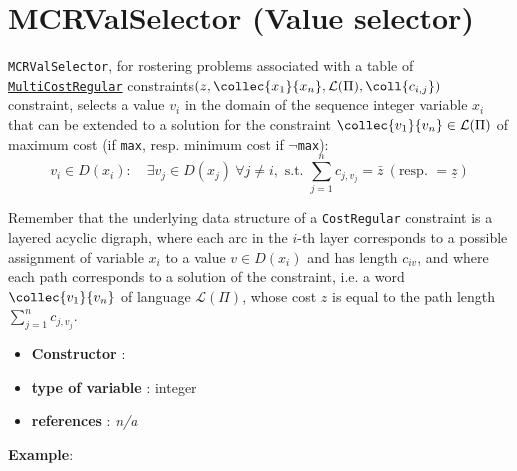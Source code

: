 \section{MCRValSelector (Value selector)}\label{mcrvalselector:mcrvalselectorvalselector}\hypertarget{mcrvalselector:mcrvalselectorvalselector}{}
\begin{notedef}
  \texttt{MCRValSelector}, for rostering problems associated with a table of \hyperlink{costregular:costregularconstraint}{\texttt{MultiCostRegular}} constraints$(z, \collec{x_1}{x_n},\mathcal{L}(\Pi), \coll{c_{i,j}})$ constraint, selects a value $v_i$ in the domain of the sequence integer variable $x_i$ that can be extended to a solution for the constraint $\collec{v_1}{v_n}\in\mathcal{L}(\Pi)$ of maximum cost (if \texttt{max}, resp. minimum cost if $\neg$\texttt{max}):
$$ v_i\in D(x_i):\quad \exists v_j\in D(x_j)\ \forall j\neq i, \text{ s.t. } \sum_{j=1}^n c_{j,v_j} = \bar{z}\ (\text{resp. } =\underline{z})$$   
\end{notedef}
Remember that the underlying data structure of a \texttt{CostRegular} constraint is a layered acyclic digraph, where each arc in the $i$-th layer corresponds to a possible assignment of variable $x_i$ to a value $v\in D(x_i)$ and has length $c_{iv}$, and where each path corresponds to a solution of the constraint, i.e. a word $\collec{v_1}{v_n}$ of language $\mathcal{L}(\Pi)$, whose cost $z$ is equal to the path length $\sum_{j=1}^n c_{j,v_j}$.

\begin{itemize}
	\item \textbf{Constructor} : 
	\item \textbf{type of variable} : integer
	\item \textbf{references} : \emph{n/a}
\end{itemize}

\textbf{Example}:
%

